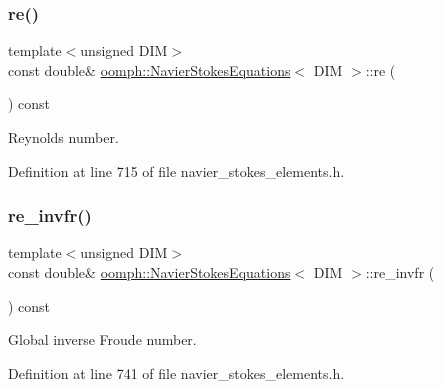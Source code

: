 \mbox{\label{classoomph_1_1NavierStokesEquations_ac9d5177e2f6e51509a25c3f794017231}} 
\subsubsection{\texorpdfstring{re()}{re()}}
{\footnotesize\ttfamily template$<$unsigned D\+IM$>$ \\
const double\& \hyperlink{classoomph_1_1NavierStokesEquations}{oomph\+::\+Navier\+Stokes\+Equations}$<$ D\+IM $>$\+::re (\begin{DoxyParamCaption}{ }\end{DoxyParamCaption}) const\hspace{0.3cm}{\ttfamily [inline]}}



Reynolds number. 



Definition at line 715 of file navier\+\_\+stokes\+\_\+elements.\+h.

\mbox{\label{classoomph_1_1NavierStokesEquations_a98252e40ee808732a128f9f9241e62d4}} 
\subsubsection{\texorpdfstring{re\+\_\+invfr()}{re\_invfr()}}
{\footnotesize\ttfamily template$<$unsigned D\+IM$>$ \\
const double\& \hyperlink{classoomph_1_1NavierStokesEquations}{oomph\+::\+Navier\+Stokes\+Equations}$<$ D\+IM $>$\+::re\+\_\+invfr (\begin{DoxyParamCaption}{ }\end{DoxyParamCaption}) const\hspace{0.3cm}{\ttfamily [inline]}}



Global inverse Froude number. 



Definition at line 741 of file navier\+\_\+stokes\+\_\+elements.\+h.

